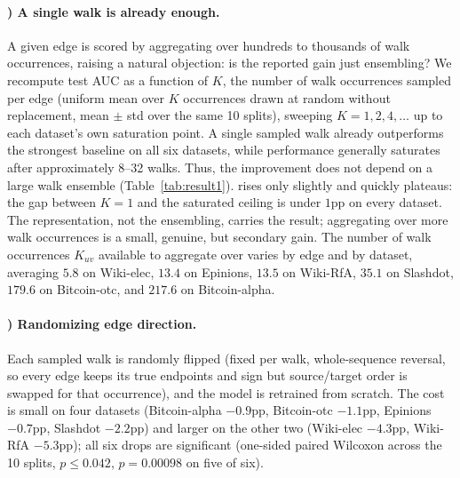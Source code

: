\documentclass[sigconf, review, anonymous]{acmart}
\newcounter{ablation}
\renewcommand{\theablation}{\Alph{ablation}}
\theoremstyle{plain}
\theoremstyle{definition}
\begin{document}
\paragraph{\theablation) A single walk is already enough.}
\label{abl:singlewalk}
A given edge is scored by aggregating over hundreds to thousands of walk occurrences, raising a natural objection: is the reported gain just ensembling? We recompute test AUC as a function of $K$, the number of walk occurrences sampled per edge (uniform mean over $K$ occurrences drawn at random without replacement, mean $\pm$ std over the same 10 splits), sweeping $K=1,2,4,\ldots$ up to each dataset's own saturation point. A single sampled walk already outperforms the strongest baseline on all six datasets, while performance generally saturates after approximately 8--32 walks. Thus, the improvement does not depend on a large walk ensemble (Table~\ref{tab:result1}).  rises only slightly and quickly plateaus: the gap between $K=1$ and the saturated ceiling is under $1$pp on every dataset. The representation, not the ensembling, carries the result; aggregating over more walk occurrences is a small, genuine, but secondary gain. The number of walk occurrences $K_{uv}$ available to aggregate over varies by edge and by dataset, averaging $5.8$ on Wiki-elec, $13.4$ on Epinions, $13.5$ on Wiki-RfA, $35.1$ on Slashdot, $179.6$ on Bitcoin-otc, and $217.6$ on Bitcoin-alpha.

\paragraph{\theablation) Randomizing edge direction.}
\label{abl:dirflip}
Each sampled walk is randomly flipped (fixed per walk, whole-sequence reversal, so every edge keeps its true endpoints and sign but source/target order is swapped for that occurrence), and the model is retrained from scratch. The cost is small on four datasets (Bitcoin-alpha $-0.9$pp, Bitcoin-otc $-1.1$pp, Epinions $-0.7$pp, Slashdot $-2.2$pp) and larger on the other two (Wiki-elec $-4.3$pp, Wiki-RfA $-5.3$pp); all six drops are significant (one-sided paired Wilcoxon across the 10 splits, $p\le0.042$, $p=0.00098$ on five of six).

\end{document}
